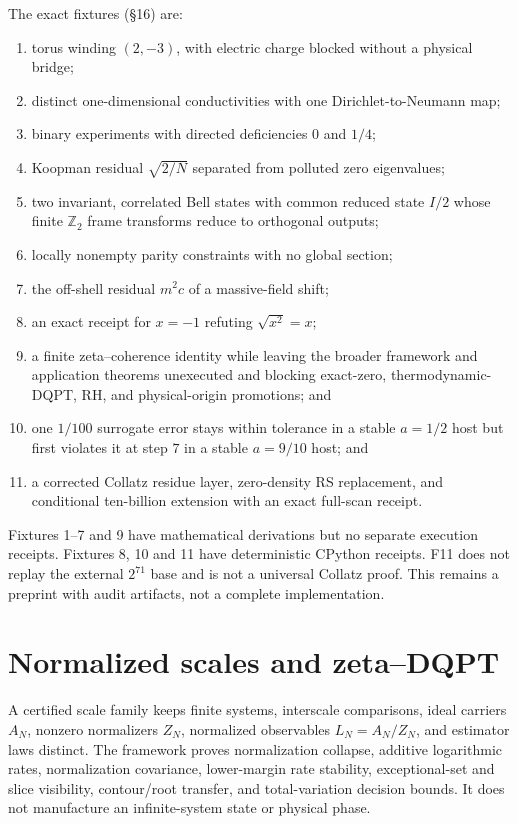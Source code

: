 \documentclass[10pt,a4paper,twocolumn]{extarticle}
\begin{document}
The exact fixtures (\S16) are:
\begin{enumerate}
\item torus winding \((2,-3)\), with electric charge blocked without a physical
bridge;
\item distinct one-dimensional conductivities with one Dirichlet-to-Neumann
map;
\item binary experiments with directed deficiencies \(0\) and \(1/4\);
\item Koopman residual \(\sqrt{2/N}\) separated from polluted zero
eigenvalues;
\item two invariant, correlated Bell states with common reduced state \(I/2\)
whose finite \(\mathbb Z_2\) frame transforms reduce to orthogonal outputs;
\newpage
\item locally nonempty parity constraints with no global section;
\item the off-shell residual \(m^2c\) of a massive-field shift;
\item an exact receipt for \(x=-1\) refuting \(\sqrt{x^2}=x\);
\item a finite zeta--coherence identity while leaving the broader framework
and application theorems unexecuted and blocking exact-zero,
thermodynamic-DQPT, RH, and physical-origin promotions; and
\item one \(1/100\) surrogate error stays within tolerance in a stable
\(a=1/2\) host but first violates it at step \(7\) in a stable \(a=9/10\)
host; and
\item a corrected Collatz residue layer, zero-density RS replacement, and
conditional ten-billion extension with an exact full-scan receipt.
\end{enumerate}
Fixtures 1--7 and 9 have mathematical derivations but no separate execution
receipts.  Fixtures 8, 10 and 11 have deterministic CPython receipts.  F11
does not replay the external \(2^{71}\) base and is not a universal Collatz
proof.  This remains a preprint with audit artifacts, not a complete
implementation.

\section*{Normalized scales and zeta--DQPT}

A certified scale family keeps finite systems, interscale comparisons, ideal
carriers \(A_N\), nonzero normalizers \(Z_N\), normalized observables
\(L_N=A_N/Z_N\), and estimator laws distinct.  The framework proves
normalization collapse, additive logarithmic rates, normalization covariance,
lower-margin rate stability, exceptional-set and slice visibility,
contour/root transfer, and total-variation decision bounds.  It does not
manufacture an infinite-system state or physical phase.
\end{document}
